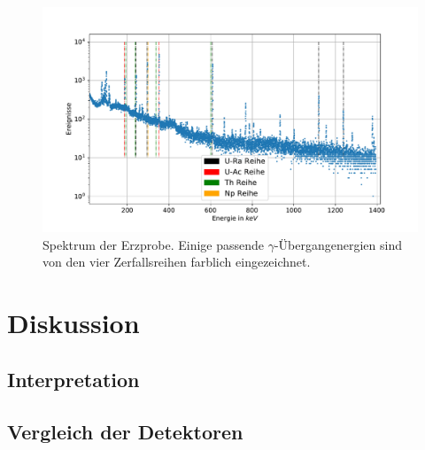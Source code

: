 \documentclass[
	a4paper,
	12pt,
	pagesize,
	ngerman
]{scrartcl}
\begin{document}
	\begin{figure}[H]
			\includegraphics[width= 1 \linewidth]{img/erz_alles}
			\caption{
			Spektrum der Erzprobe. Einige passende $\gamma$-Übergangenergien sind von den vier Zerfallsreihen farblich eingezeichnet.
			}
			\label{fg_erz}
	\end{figure}

	\section{Diskussion}

	\subsection{Interpretation}

	\subsection{Vergleich der Detektoren}
\end{document}
